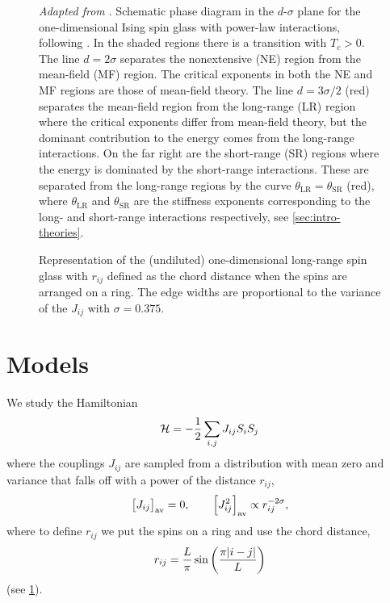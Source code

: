 \begin{figure}
  \centering
  
  \caption[
    Schematic phase diagram of the one-dimensional Ising spin glass with
    power-law interactions.
  ]
  {
    \emph{Adapted from \textcite{katzgraber2003monte}}.
    Schematic phase diagram in the $d$-$\sigma$ plane for the one-dimensional
    Ising spin glass with power-law interactions, following
    \textcite{fisher1988equilibrium}. In the shaded regions there is a
    transition with $T_c>0$. The line $d=2\sigma$ separates the nonextensive
    (NE) region from the mean-field (MF) region. The critical exponents in both
    the NE and MF regions are those of mean-field theory. The line
    $d=3\sigma/2$ (red) separates the mean-field region from the long-range
    (LR) region where the critical exponents differ from mean-field theory, but
    the dominant contribution to the energy comes from the long-range
    interactions. On the far right are the short-range (SR) regions where the
    energy is dominated by the short-range interactions. These are separated
    from the long-range regions by the curve
    $\theta_{\mathrm{LR}}=\theta_{\mathrm{SR}}$ (red), where
    $\theta_{\mathrm{LR}}$ and $\theta_{\mathrm{SR}}$ are the stiffness
    exponents corresponding to the long- and short-range interactions
    respectively, see \cref{sec:intro-theories}.
  }
\end{figure}

\begin{figure}
  \centering
  
  \caption[
    Representation of the one-dimensional long-range Ising spin glass
    with periodic boundary conditions.
  ]
  {
    Representation of the (undiluted) one-dimensional long-range spin glass
    with $r_{ij}$ defined as the chord distance when the spins are arranged on
    a ring. The edge widths are proportional to the variance of the $J_{ij}$
    with $\sigma=0.375$.
  } \label{fig:1dlr-chord}
\end{figure}


\section{Models}
\label{sec:nonextensive-models}

We study the Hamiltonian
\begin{equation}
    \mathcal{H} = -\frac{1}{2} \sum_{i,j} J_{ij} S_i S_j
\end{equation}
where the couplings $J_{ij}$ are sampled from a distribution with mean zero and
variance that falls off with a power of the distance $r_{ij}$,
\begin{equation}
  \left[J_{ij}\right]_{\mathrm{av}} = 0,
  \qquad
  \left[J_{ij}^2\right]_{\mathrm{av}} \propto r_{ij}^{-2\sigma},
  \label{eq:J-mean-variance-lr}
\end{equation}
where to define $r_{ij}$ we put the spins on a ring and use the chord distance,
\begin{equation}
  r_{ij} = \frac{L}{\pi} \sin\left(\frac{\pi\abs{i-j}}{L}\right)
  \label{eq:chord-distance}
\end{equation}
(see \cref{fig:1dlr-chord}).

